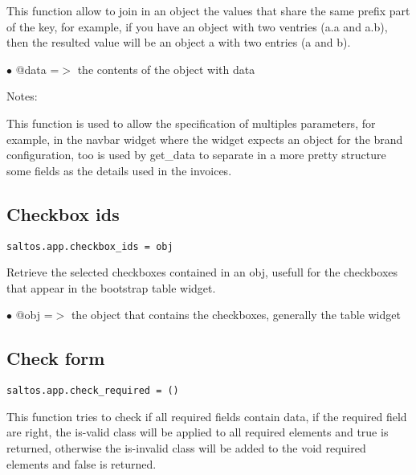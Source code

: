 \documentclass[a4paper]{book}
\begin{document}
This function allow to join in an object the values that share the same prefix part of
the key, for example, if you have an object with two ventries (a.a and a.b), then the
resulted value will be an object a with two entries (a and b).

\begin{compactitem}
\item[\color{myblue}$\bullet$] @data =$>$ the contents of the object with data
\end{compactitem}

Notes:

This function is used to allow the specification of multiples parameters, for example,
in the navbar widget where the widget expects an object for the brand configuration, too
is used by get\_data to separate in a more pretty structure some fields as the details used
in the invoices.

\hypertarget{toc419}{}
\subsection{Checkbox ids}

\begin{lstlisting}
saltos.app.checkbox_ids = obj
\end{lstlisting}

Retrieve the selected checkboxes contained in an obj, usefull for the checkboxes
that appear in the bootstrap table widget.

\begin{compactitem}
\item[\color{myblue}$\bullet$] @obj =$>$ the object that contains the checkboxes, generally the table widget
\end{compactitem}

\hypertarget{toc420}{}
\subsection{Check form}

\begin{lstlisting}
saltos.app.check_required = ()
\end{lstlisting}

This function tries to check if all required fields contain data, if the required field are
right, the is-valid class will be applied to all required elements and true is returned,
otherwise the is-invalid class will be added to the void required elements and false is
returned.

\hypertarget{toc421}{}
\end{document}
